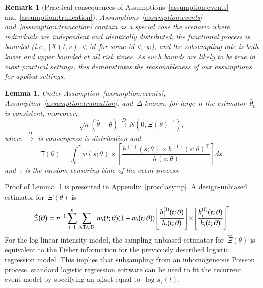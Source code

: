 \documentclass[12pt]{amsart}
\newtheorem{lemma}[thm]{Lemma}
\newtheorem{rmk}[thm]{Remark}%
\def\bfT{{\bf T}}
\newenvironment{newmaterial}{\color{blue}}{\par}
\begin{document}
\begin{rmk}[Practical consequences of Assumptions~\ref{assumption:events} and~\ref{assumption:truncation}]
Assumptions~\ref{assumption:events} and~\ref{assumption:truncation} contain as a special case the scenario where individuals are independent and identically distributed, the functional process is bounded (i.e., $|X(t,s)| < M$ for some $M <\infty$), and the subsampling rate is both lower and upper bounded at all risk times. As such bounds are likely to be true in most practical settings, this demonstrates the reasonableness of our assumptions for applied settings.
\end{rmk}

\begin{lemma} \normalfont
\label{lemma:simpleasym}
Under Assumption~\ref{assumption:events}, Assumption~\ref{assumption:truncation}, and~$\Delta$ known, for large~$n$ the estimator~$\hat \theta_n$ is consistent; moreover,
\[
\sqrt{n} (\hat \theta - \theta) \overset{D}{\to} N(0, \Xi (\theta)^{-1}),
\]
where $\overset{D}{\to}$ is convergence is distribution and
\[
  \Xi (\theta) = \int_{0}^{\tau} w(s; \theta) \times \left[ \frac{h^{(1)}(s;
      \theta) \times  h^{(1)} (s;\theta)^{\top}}{h(s; \theta)} \right]
  ds.
\]
and~$\tau$ is the random censoring time of the event process.
\end{lemma}
Proof of Lemma~\ref{lemma:simpleasym} is presented in Appendix~\ref{proof:asymp}. A design-unbiased estimator for~$\Xi(\theta)$ is
\begin{equation}
\label{eq:fisher}
  \hat \Xi (\theta) = n^{-1} \sum_{i=1}^n \sum_{t \in \bfT_i \cup D_i}
  w_i(t;\theta) (1-w_i(t;\theta)) \left[ \frac{h_i^{(1)}(t;
      \theta)}{h_i (t; \theta)} \right] \times  \left [
    \frac{h_i^{(1)} (t;\theta)}{h_i(t; \theta)} \right]^\top
\end{equation}
For the log-linear intensity model, the sampling-unbiased estimator for~$\hat \Xi(\theta)$ is equivalent to the Fisher information for the previously described logistic regression model.
This implies that subsampling from an inhomogeneous Poisson process, standard logistic regression software can be used to fit the recurrent event model by specifying an offset equal to~$\log \pi_i (t)$.
\end{document}
